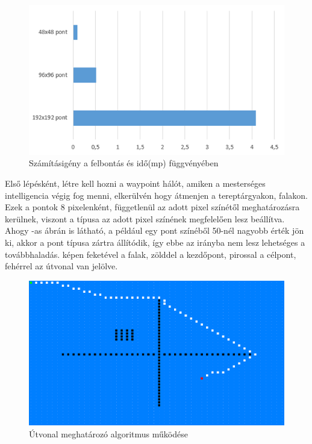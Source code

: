 \begin{figure}[h]
\centering
\includegraphics[scale=0.9]{kepek/utvonal_szamitas_diagram_waypointokra.png}
\caption{Számításigény a felbontás és idő(mp) függvényében}
\label{fig:diagram_utvonal}
\end{figure}

Első lépésként, létre kell hozni a waypoint hálót, amiken a mesterséges intelligencia végig fog menni, elkerülvén hogy átmenjen a tereptárgyakon, falakon. Ezek a pontok 8 pixelenként, függetlenül az adott pixel színétől meghatározásra kerülnek, viszont a típusa az adott pixel színének megfelelően lesz beállítva. Ahogy -as ábrán is látható, a például egy pont színéből 50-nél nagyobb érték jön ki, akkor a pont típusa zártra állítódik, így ebbe az irányba nem lesz lehetséges a továbbhaladás.  képen feketével a falak, zölddel a kezdőpont, pirossal a célpont, fehérrel az útvonal van jelölve.

\begin{figure}[h]
\centering
\includegraphics[scale=0.48]{kepek/mi_printscreen.png}
\caption{Útvonal meghatározó algoritmus működése}
\label{fig:mi_printscreen}
\end{figure}


